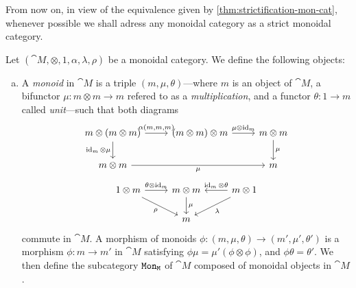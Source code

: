 \documentclass[../../deep-dive]{subfiles}
\begin{document}
From now on, in view of the equivalence given by
\cref{thm:strictification-mon-cat}, whenever possible we shall adress any
monoidal category as a strict monoidal category.

\begin{definition}
    \label{def:(co)monoids}
    Let \((\cat M, \otimes, 1, \alpha, \lambda, \rho)\) be a monoidal category. We
    define the following objects:
    \begin{enumerate}[(a)]\setlength\itemsep{0em}
        \item A \emph{monoid} in \(\cat M\) is a triple \((m, \mu, \theta)\)---where
              \(m\) is an object of \(\cat M\), a bifunctor \(\mu: m \otimes m \to m\)
              refered to as a \emph{multiplication}, and a functor \(\theta: 1 \to m\)
              called \emph{unit}---such that both diagrams
              \[
                  \begin{tikzcd}
                      m \otimes (m \otimes m) \ar[d, "\Id_m \otimes \mu"']
                      \ar[r, "{\alpha(m, m, m)}"]
                      &(m \otimes m) \otimes m
                      \ar[r, "\mu \otimes \Id_m"]
                      &m \otimes m \ar[d, "\mu"] \\
                      m \otimes m \ar[rr, "\mu"']
                      &&m
                  \end{tikzcd}
              \]
              \[
                  \begin{tikzcd}
                      1 \otimes m \ar[r, "\theta \otimes \Id_m"]
                      \ar[rd, "\rho"']
                      & m \otimes m \ar[d, "\mu"]
                      &m \otimes 1
                      \ar[l, "\Id_m \otimes \theta"']
                      \ar[ld, "\lambda"] \\
                      &m &
                  \end{tikzcd}
              \]
              commute in \(\cat M\). A morphism of monoids
              \(\phi: (m, \mu, \theta) \to (m', \mu', \theta')\) is a morphism
              \(\phi: m \to m'\) in \(\cat M\) satisfying
              \(\phi \mu = \mu'(\phi \otimes \phi)\), and \(\phi \theta = \theta'\). We then
              define the subcategory \({\texttt{Mon}}_{\texttt M}\) of \(\cat M\) composed of monoidal
              objects in \(\cat M\).


\end{enumerate}
\end{definition}
\end{document}
